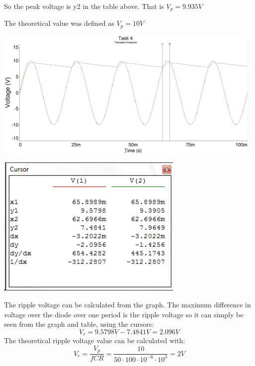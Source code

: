 \documentclass[11pt,a4paper]{article}
\begin{document}
\begin{enumerate}
    \vspace{2em}
        
    So the peak voltage is y2 in the table above. That is $V_p = 9.935 V$ 
    
    The theoretical value was defined as $V_p = 10 V$ \\
    
    \begin{minipage}{\linewidth}
    	\centering
        \includegraphics[width=13cm]{4_3.jpg}
    \end{minipage}
    
    \begin{minipage}{\linewidth}
    	\centering
        \includegraphics[width=9cm]{table_4_2.png}
    \end{minipage}
    
    \vspace{2em}
    
	The ripple voltage can be calculated from the graph. The maximum difference in voltage over the diode over one period is the ripple voltage so it can simply be seen from the graph and table, using the cursors: $$ V_r = 9.5798 V - 7.4841 V = 2.096 V$$
    The theoretical ripple voltage value can be calculated with: $$ V_r = \dfrac{V_p}{fCR} = \dfrac{10}{50 \cdot 100 \cdot 10^{-6} \cdot 10^3} = 2 V$$
    \vspace{2em}
  

\end{enumerate}
\end{document}
